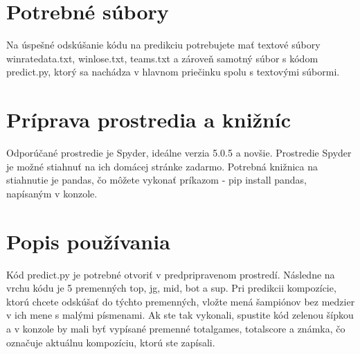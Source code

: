 \section*{Potrebné súbory}
Na úspešné odskúšanie kódu na predikciu potrebujete mať textové súbory winratedata.txt, winlose.txt, teams.txt a zároveň samotný súbor s kódom predict.py, ktorý sa nachádza v hlavnom priečinku spolu s textovými súbormi.

\section*{Príprava prostredia a knižníc} 
Odporúčané prostredie je Spyder, ideálne verzia 5.0.5 a novšie. Prostredie Spyder je možné stiahnuť na ich domácej stránke zadarmo. Potrebná knižnica na stiahnutie je pandas, čo môžete vykonať príkazom - pip install pandas, napísaným v konzole.

\section*{Popis používania}
Kód predict.py je potrebné otvoriť v predpripravenom prostredí. Následne na vrchu kódu je 5 premenných top, jg, mid, bot a sup. Pri predikcii kompozície, ktorú chcete odskúšať do týchto premenných, vložte mená šampiónov bez medzier v ich mene s malými písmenami. Ak ste tak vykonali, spustite kód zelenou šípkou a v konzole by mali byť vypísané premenné totalgames, totalscore a známka, čo označuje aktuálnu kompozíciu, ktorú ste zapísali. 
